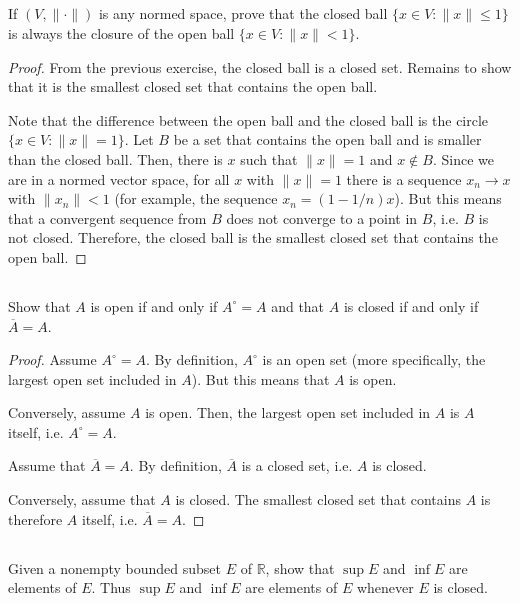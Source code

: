 \subsection{} If $(V, \| \cdot \|)$ is any normed space, prove that the closed ball $\{x \in V : \|x \| \leq 1\}$ is always the closure of the open ball $\{x \in V : \|x\| < 1\}$.

\begin{proof}
From the previous exercise, the closed ball is a closed set. Remains to show that it is the smallest closed set that contains the open ball.

Note that the difference between the open ball and the closed ball is the circle $\{x \in V : \|x\| = 1\}$. Let $B$ be a set that contains the open ball and is smaller than the closed ball. Then, there is $x$ such that $\|x\|=1$ and $x \notin B$. Since we are in a normed vector space, for all $x$ with $\|x\| = 1$ there is a sequence $x_n \rightarrow x$ with $\|x_n\| < 1$ (for example, the sequence $x_n = (1-1/n)x$). But this means that a convergent sequence from $B$ does not converge to a point in $B$, i.e. $B$ is not closed. Therefore, the closed ball is the smallest closed set that contains the open ball.
\end{proof}

\subsection{} Show that $A$ is open  if and only if $A^\circ =  A$ and that $A$ is closed if and only if $\overline{A}= A$.

\begin{proof}
Assume $A^\circ = A$. By definition, $A^\circ$ is an open set (more specifically, the largest open set included in $A$). But this means that $A$ is open.

Conversely, assume $A$ is open. Then, the largest open set included in $A$ is $A$ itself, i.e. $A^\circ = A$.

Assume that $\overline{A} = A$. By definition, $\overline{A}$ is a closed set, i.e. $A$ is closed.

Conversely, assume that $A$ is closed. The smallest closed set that contains $A$ is therefore $A$ itself, i.e. $\overline{A} = A$.
\end{proof}

\subsection{} Given a  nonempty  bounded  subset $E$ of $\mathbb{R}$, show that $\sup E$ and $\inf E$ are elements of $E$. Thus $\sup E$ and $\inf E$ are elements of $E$ whenever $E$ is closed. 

